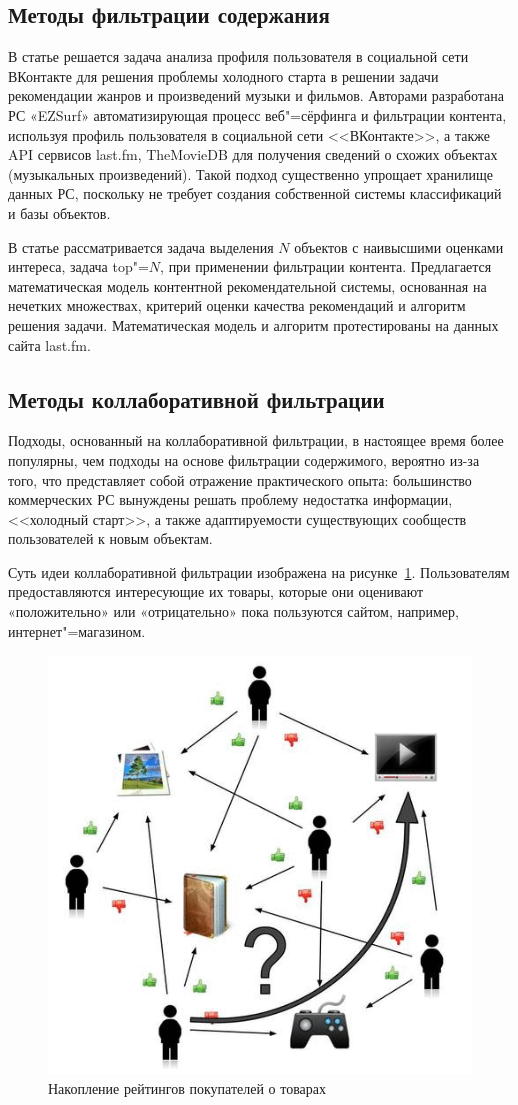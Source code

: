 \documentclass[a4paper,14pt,openany,final]{extreport} %
\begin{document}
\subsection{Методы фильтрации содержания}
\label{sec:content-filtering}

В статье \cite{b5} решается задача анализа профиля пользователя в социальной сети ВКонтакте для решения проблемы холодного старта в решении задачи рекомендации жанров и произведений музыки и фильмов. Авторами разработана РС «EZSurf» автоматизирующая процесс веб"=сёрфинга и фильтрации контента, используя профиль пользователя в социальной сети <<ВКонтакте>>, а также API сервисов last.fm, TheMovieDB для получения сведений о схожих объектах (музыкальных произведений). Такой подход существенно упрощает хранилище данных РС, поскольку не требует создания собственной системы классификаций и базы объектов.

В статье \cite{b9} рассматривается задача выделения $N$ объектов с наивысшими оценками интереса, задача top"=$N$, при применении фильтрации контента. Предлагается математическая модель контентной рекомендательной системы, основанная на нечетких множествах, критерий оценки качества рекомендаций и алгоритм решения задачи. Математическая модель и алгоритм протестированы на данных сайта last.fm.

\subsection{Методы коллаборативной фильтрации}
\label{sec:collab-filtering}

Подходы, основанный на коллаборативной фильтрации, в настоящее время более популярны, чем подходы на основе фильтрации содержимого, вероятно из-за того, что представляет собой отражение практического опыта: большинство коммерческих РС вынуждены решать проблему недостатка информации, <<холодный старт>>, а также адаптируемости существующих сообществ пользователей к новым объектам.

Суть идеи коллаборативной фильтрации изображена на рисунке~\ref{fig:collab-essence}. Пользователям предоставляются интересующие их товары, которые они оценивают «положительно» или «отрицательно» пока пользуются сайтом, например, интернет"=магазином.

\begin{figure}[htb]\centering
  \includegraphics[width=0.5\linewidth]{collab1.png}
\caption{Накопление рейтингов покупателей о товарах}
\label{fig:collab-essence}
\end{figure}
\end{document}
